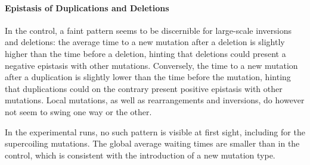 \paragraph{Epistasis of Duplications and Deletions}
In the control, a faint pattern seems to be discernible for large-scale inversions and deletions: the average time to a new mutation after a deletion is slightly higher than the time before a deletion, hinting that deletions could present a negative epistasis with other mutations.
Conversely, the time to a new mutation after a duplication is slightly lower than the time before the mutation, hinting that duplications could on the contrary present positive epistasis with other mutations.
Local mutations, as well as rearrangements and inversions, do however not seem to swing one way or the other.

In the experimental runs, no such pattern is visible at first sight, including for the supercoiling mutations.
The global average waiting times are smaller than in the control, which is consistent with the introduction of a new mutation type.


